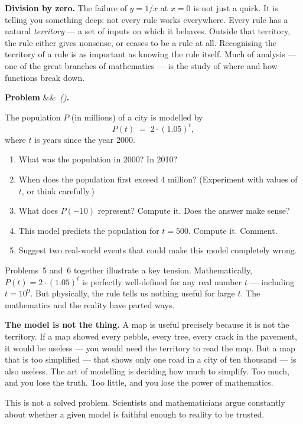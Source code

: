 \documentclass[12pt, a4paper]{article}
\newcounter{problem}
\newenvironment{problem}[1][]{%
  \refstepcounter{problem}%
  \par\vspace{6pt}%
  \noindent\textbf{\color{MidBlue}Problem \theproblem}%
  \ifx&#1&\else\ \textit{(#1)}\fi\textbf{.}\enskip
}{\par\vspace{4pt}}
\begin{document}
\begin{thought}
\textbf{Division by zero.}
The failure of $y = 1/x$ at $x = 0$ is not just a quirk. It is telling you something deep: not every rule works everywhere. Every rule has a natural \emph{territory} --- a set of inputs on which it behaves. Outside that territory, the rule either gives nonsense, or ceases to be a rule at all. Recognising the territory of a rule is as important as knowing the rule itself. Much of analysis --- one of the great branches of mathematics --- is the study of where and how functions break down.
\end{thought}

\begin{problem}
\label{prob:population}
The population $P$ (in millions) of a city is modelled by
\[
  P(t) \;=\; 2 \cdot (1.05)^{t},
\]
where $t$ is years since the year 2000.
\begin{enumerate}[label=(\alph*), topsep=2pt]
  \item What was the population in 2000? In 2010?
  \item When does the population first exceed 4 million? (Experiment with values of $t$, or think carefully.)
  \item What does $P(-10)$ represent? Compute it. Does the answer make sense?
  \item This model predicts the population for $t = 500$. Compute it. Comment.
  \item Suggest two real-world events that could make this model completely wrong.
\end{enumerate}
\end{problem}

Problems~5 and~6 together illustrate a key tension. Mathematically, $P(t) = 2 \cdot (1.05)^t$ is perfectly well-defined for any real number $t$ --- including $t = 10^9$. But physically, the rule tells us nothing useful for large $t$. The mathematics and the reality have parted ways.

\begin{thought}
\textbf{The model is not the thing.}
A map is useful precisely because it is not the territory. If a map showed every pebble, every tree, every crack in the pavement, it would be useless --- you would need the territory to read the map. But a map that is too simplified --- that shows only one road in a city of ten thousand --- is also useless. The art of modelling is deciding how much to simplify. Too much, and you lose the truth. Too little, and you lose the power of mathematics.

This is not a solved problem. Scientists and mathematicians argue constantly about whether a given model is faithful enough to reality to be trusted.
\end{thought}
\end{document}

